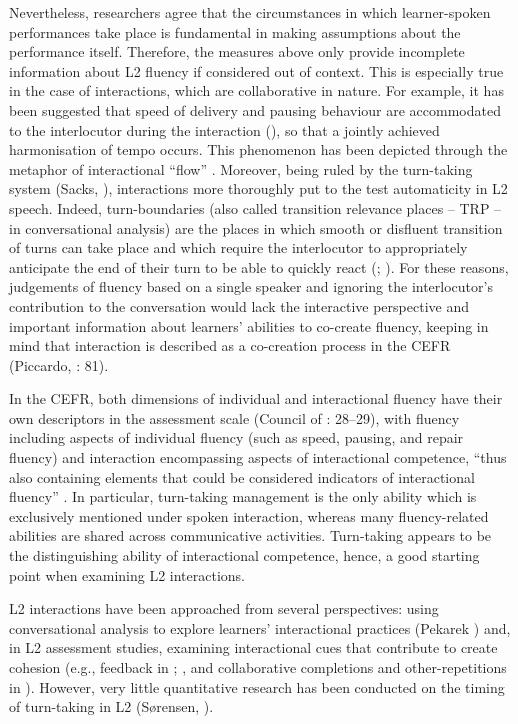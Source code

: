 Nevertheless, researchers agree that the circumstances in which learner-spoken performances take place is fundamental in making assumptions about the performance itself. Therefore, the measures above only provide incomplete information about L2 fluency if considered out of context. This is especially true in the case of interactions, which are collaborative in nature. For example, it has been suggested that speed of delivery and pausing behaviour are accommodated to the interlocutor during the interaction (\citealt{KousidisDorran2009}), so that a jointly achieved harmonisation of tempo occurs. This phenomenon has been depicted through the metaphor of interactional “flow” \citep{McCarthy2009}. Moreover, being ruled by the turn-taking system (Sacks, \citealt{SchegloffJefferson1974}), interactions more thoroughly put to the test automaticity in L2 speech. Indeed, turn-boundaries (also called transition relevance places – TRP – in conversational analysis) are the places in which smooth or disfluent transition of turns can take place and which require the interlocutor to appropriately anticipate the end of their turn to be able to quickly react (\citealt{BögelsTorreira2015}; \citealt{Levinson2016}). For these reasons, judgements of fluency based on a single speaker and ignoring the interlocutor’s contribution to the conversation would lack the interactive perspective and important information about learners’ abilities to co-create fluency, keeping in mind that interaction is described as a co-creation process in the CEFR (Piccardo, \citealt{GoodierNorth2018}: 81). 

In the CEFR, both dimensions of individual and interactional fluency have their own descriptors in the assessment scale (Council of \citealt{Europe2001}: 28–29), with fluency including aspects of individual fluency (such as speed, pausing, and repair fluency) and interaction encompassing aspects of interactional competence, “thus also containing elements that could be considered indicators of interactional fluency” \citep[30]{Peltonen2017}. In particular, turn-taking management is the only ability which is exclusively mentioned under spoken interaction, whereas many fluency-related abilities are shared across communicative activities. Turn-taking appears to be the distinguishing ability of interactional competence, hence, a good starting point when examining L2 interactions.

L2 interactions have been approached from several perspectives: using conversational analysis to explore learners’ interactional practices (Pekarek \citealt{DoehlerBerger2015,DoehlerBerger2018}) and, in L2 assessment studies, examining interactional cues that contribute to create cohesion (e.g., feedback in \citealt{Galaczi2014}; \citealt{MayEtAl2020}, and collaborative completions and other-repetitions in \citealt{Peltonen2017}). However, very little quantitative research has been conducted on the timing of turn-taking in L2 (Sørensen, \citealt{FereczkowskiMacDonald2021}).

